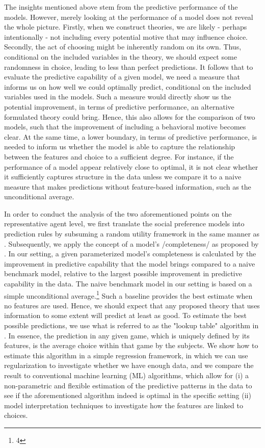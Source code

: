 \documentclass[letterpaper,11pt,leqno]{article}
\begin{document}
The insights mentioned above stem from the predictive performance of the models. However, merely looking at the performance of a model does not reveal the whole picture. Firstly, when we construct theories, we are likely - perhaps intentionally - not including every potential motive that may influence choice. Secondly, the act of choosing might be inherently random on its own. Thus, conditional on the included variables in the theory, we should expect some randomness in choice, leading to less than perfect predictions. It follows that to evaluate the predictive capability of a given model, we need a measure that informs us on how well we could optimally predict, conditional on the included variables used in the models. Such a measure would directly show us the potential improvement, in terms of predictive performance, an alternative formulated theory could bring. Hence, this also allows for the comparison of two models, such that the improvement of including a behavioral motive becomes clear. At the same time, a lower boundary, in terms of predictive performance, is needed to inform us whether the model is able to capture the relationship between the features and choice to a sufficient degree. For instance, if the performance of a model appear relatively close to optimal, it is not clear whether it sufficiently captures structure in the data unless we compare it to a naive measure that makes predictions without feature-based information, such as the unconditional average.

In order to conduct the analysis of the two aforementioned points on the representative agent level, we first translate the social preference models into prediction rules by subsuming a random utility framework in the same manner as \cite{Bruhin2019}. Subsequently, we apply the concept of a model's /completeness/ as proposed by \cite{Fudenberg2022}. In our setting, a given parameterized model's completeness is calculated by the improvement in predictive capability that the model brings compared to a naive benchmark model, relative to the largest possible improvement in predictive capability in the data. The naive benchmark model in our setting is based on a simple unconditional average.\footnote{4} Such a baseline provides the best estimate when no features are used. Hence, we should expect that any proposed theory that uses information to some extent will predict at least as good. To estimate the best possible predictions, we use what is referred to as the "lookup table" algorithm in \cite{Fudenberg2022}. In essence, the prediction in any given game, which is uniquely defined by its features, is the average choice within that game by the subjects. We show how to estimate this algorithm in a simple regression framework, in which we can use regularization to investigate whether we have enough data, and we compare the result to conventional machine learning (ML) algorithms, which allow for (i) a non-parametric and flexible estimation of the predictive patterns in the data to see if the aforementioned algorithm indeed is optimal in the specific setting (ii) model interpretation techniques to investigate how the features are linked to choices. 
\end{document}
